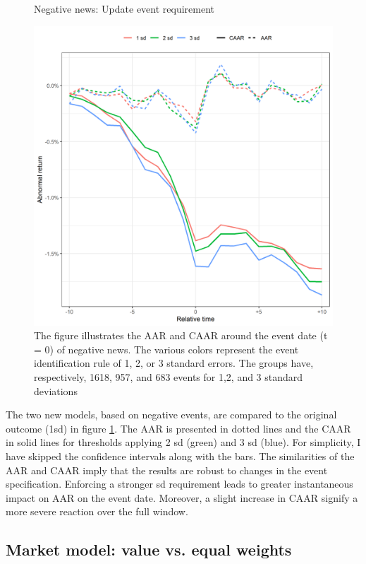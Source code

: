 \begin{figure} [H]
    \centering
    \caption{Negative news: Update event requirement}
    \includegraphics[scale=0.6]{Projekt/1.Figures analysis/ST_negative_sensitivity.png}
     \caption*{\footnotesize The figure illustrates the AAR and CAAR around the event date (t = 0) of negative news. The various colors represent the event identification rule of 1, 2, or 3 standard errors. The groups have, respectively, 1618, 957, and 683 events for 1,2, and 3 standard deviations}
    \label{fig:ST_neg_sensitivity}
\end{figure} 

The two new models, based on negative events, are compared to the original outcome (1sd) in figure \ref{fig:ST_neg_sensitivity}. The AAR is presented in dotted lines and the CAAR in solid lines for thresholds applying 2 sd (green) and 3 sd (blue). For simplicity, I have skipped the confidence intervals along with the bars. The similarities of the AAR and CAAR imply that the results are robust to changes in the event specification. Enforcing a stronger sd requirement leads to greater instantaneous impact on AAR on the event date. Moreover, a slight increase in CAAR signify a more severe reaction over the full window. 

\subsection{Market model: value vs. equal weights} \label{sec: sens_st_weights}

